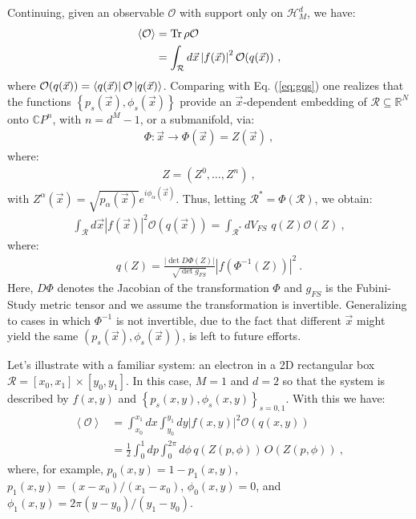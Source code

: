 \documentclass[draft,nofootinbib,pre,twocolumn,showpacs,showkeys,preprintnumbers,floatfix]{revtex4-1}
\newcommand{\1}{\mathbbm{1}}
\newcommand{\MV}[1]{\left\langle #1 \right\rangle}
\begin{document}
Continuing, given an observable $\mathcal{O}$ with support only on
$\mathcal{H}^d_M$, we have:
\begin{align*}
\MV{\mathcal{O}} & = \Tr \rho \mathcal{O} \\
  & = \int_{\mathcal{R}} d\vec{x}
  \left\vert f(\vec{x})\right\vert^2 \mathcal{O}({q(\vec{x})})
  ~,
\end{align*}
where $\mathcal{O}({q(\vec{x})}) = \bra{q(\vec{x})}\mathcal{O}
\ket{q(\vec{x})}$. Comparing with Eq. (\ref{eq:gqs})
one realizes that the functions $\left\{p_s(\vec{x}),\phi_s(\vec{x})\right\}$ provide an $\vec{x}$-dependent embedding of 
$\mathcal{R} \subseteq \mathbb{R}^N$ onto $\mathbb{C}P^n$, with $n=d^M-1$, or
a submanifold, via:
\begin{align*}
\Phi : \vec{x} \to \Phi(\vec{x}) = Z(\vec{x})
  ~,
\end{align*}
where:
\begin{align*}
Z = (Z^0,\ldots,Z^n)
  ~,
\end{align*}
with $Z^\alpha(\vec{x}) = \sqrt{p_\alpha(\vec{x})}e^{i\phi_\alpha(\vec{x})}$.
Thus, letting $\mathcal{R}^{*} = \Phi(\mathcal{R})$, we obtain:
\begin{align*}
\int_{\mathcal{R}} d\vec{x} \left\vert f(\vec{x})\right\vert^2 \mathcal{O}({q(\vec{x})}) = \int_{\mathcal{R}^{*}} dV_{FS} \,\, q(Z) \mathcal{O}(Z)
  ~,
\end{align*}
where:
\begin{align*}
q(Z) = \frac{\left\vert \det D\Phi (Z)
  \right\vert }{\sqrt{\det g_{FS}}} \left\vert f(\Phi^{-1}(Z)) \right\vert^2
  ~.
\end{align*}
Here, $D\Phi$ denotes the Jacobian of the transformation $\Phi$ and $g_{FS}$ is
the Fubini-Study metric tensor and we assume the transformation is invertible.
Generalizing to cases in which $\Phi^{-1}$ is not invertible, due to the fact
that different $\vec{x}$ might yield the same $\left(
p_s(\vec{x}),\phi_s(\vec{x})\right)$, is left to future efforts.

Let's illustrate with a familiar system: an electron in a 2D rectangular box
$\mathcal{R} = [x_0,x_1] \times [y_0,y_1]$. In this case, $M=1$ and $d=2$ so
that the system is described by $f(x,y)$ and $\left\{p_s(x,y),
\phi_s(x,y)\right\}_{s=0,1}$. With this we have:
\begin{align*}
\MV{\mathcal{O}} & = \int_{x_0}^{x_1} \!\!\! dx \int_{y_0}^{y_1} \!\!\!dy
  |f(x,y)|^2 \mathcal{O}(q(x,y)) \\
  & = \frac{1}{2}\int_0^1 \!\!\!dp \int_0^{2\pi}\!\!\!\!\!d\phi \, q(Z(p,\phi)) \, O(Z(p,\phi))
  ~,
\end{align*}
where, for example, $p_0(x,y) = 1 - p_1(x,y)$, $p_1(x,y) = (x -
x_0)/(x_1-x_0)$, $\phi_0(x,y) = 0$, and $\phi_1(x,y) = 2\pi (y -
y_0)/(y_1-y_0)$.
\end{document}
